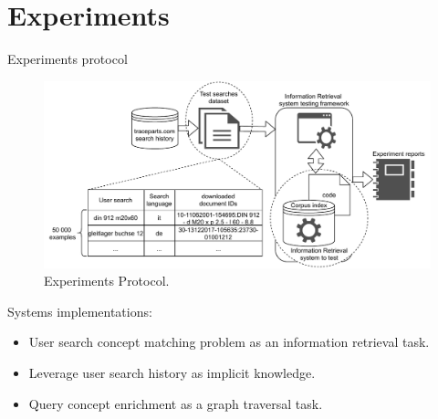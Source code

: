 \section{Experiments}

\begin{frame}{Experiments protocol}

    \begin{figure} [H]
        \begin{center}
            \includegraphics[scale=0.6]{images/tp-search-expe-setting.pdf} 
            \caption{Experiments Protocol.} 
        \end{center}
    \end{figure}

    Systems implementations:
    \begin{itemize}
        \item User search concept matching problem as an information retrieval task.
        \item Leverage user search history as implicit knowledge.
        \item Query concept enrichment as a graph traversal task.
    \end{itemize}

\end{frame}